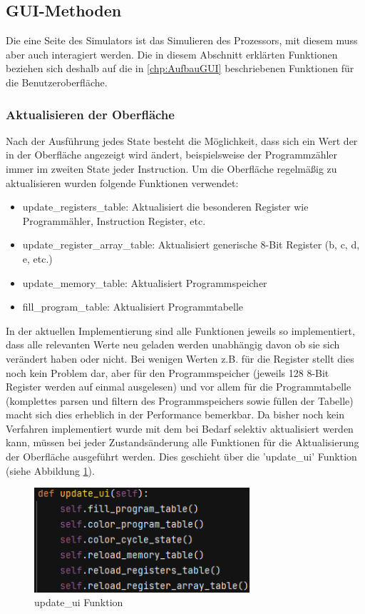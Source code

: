 \documentclass[12pt]{article}
\begin{document}
\subsection{GUI-Methoden}
Die eine Seite des Simulators ist das Simulieren des Prozessors, mit diesem muss aber auch interagiert werden. Die in diesem Abschnitt erklärten Funktionen beziehen sich deshalb auf die in \ref{chp:AufbauGUI} beschriebenen Funktionen für die Benutzeroberfläche.

\subsubsection{Aktualisieren der Oberfläche}
Nach der Ausführung jedes State besteht die Möglichkeit, dass sich ein Wert der in der Oberfläche angezeigt wird ändert, beispielsweise der Programmzähler immer im zweiten State jeder Instruction. Um die Oberfläche regelmäßig zu aktualisieren wurden folgende Funktionen verwendet:
\begin{itemize}
	\item update\_registers\_table: Aktualisiert die besonderen Register wie Programmähler, Instruction Register, etc.
	\item update\_register\_array\_table: Aktualisiert generische 8-Bit Register (b, c, d, e, etc.)
	\item update\_memory\_table: Aktualisiert Programmspeicher
	\item fill\_program\_table: Aktualisiert Programmtabelle
\end{itemize}
\noindent
In der aktuellen Implementierung sind alle Funktionen jeweils so implementiert, dass alle relevanten Werte neu geladen werden unabhängig davon ob sie sich verändert haben oder nicht. Bei wenigen Werten z.B. für die Register stellt dies noch kein Problem dar, aber für den Programmspeicher (jeweils 128 8-Bit Register werden auf einmal ausgelesen) und vor allem für die Programmtabelle (komplettes parsen und filtern des Programmspeichers sowie füllen der Tabelle) macht sich dies erheblich in der Performance bemerkbar. Da bisher noch kein Verfahren implementiert wurde mit dem bei Bedarf selektiv aktualisiert werden kann, müssen bei jeder Zustandsänderung alle Funktionen für die Aktualisierung der Oberfläche ausgeführt werden. Dies geschieht über die 'update\_ui' Funktion (siehe Abbildung \ref{fig:updateUI}).

\begin{figure}[H]
\centering
\includegraphics[width=8cm]{bilder/updateUI}
\caption{update\_ui Funktion}
\label{fig:updateUI}
\end{figure}
\end{document}
